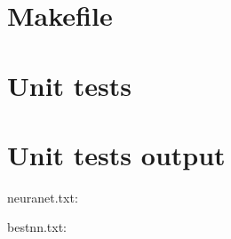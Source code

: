 \begin{scriptsize}
\begin{ttfamily}

\end{ttfamily}
\end{scriptsize}

\section{Makefile}

\begin{scriptsize}
\begin{ttfamily}

\end{ttfamily}
\end{scriptsize}

\section{Unit tests}

\begin{scriptsize}
\begin{ttfamily}

\end{ttfamily}
\end{scriptsize}

\section{Unit tests output}

\begin{scriptsize}
\begin{ttfamily}

\end{ttfamily}
\end{scriptsize}

neuranet.txt:\\
\begin{scriptsize}
\begin{ttfamily}

\end{ttfamily}
\end{scriptsize}

bestnn.txt:\\
\begin{scriptsize}
\begin{ttfamily}

\end{ttfamily}
\end{scriptsize}

